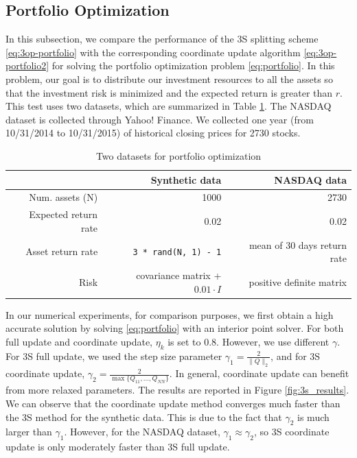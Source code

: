\subsection{Portfolio Optimization}
In this subsection, we compare the performance of the 3S splitting scheme \eqref{eq:3op-portfolio} with the corresponding coordinate update algorithm \eqref{eq:3op-portfolio2} for solving the portfolio optimization problem \eqref{eq:portfolio}. In this problem, our goal is to distribute our investment resources to all the assets so that the investment risk is minimized and the expected return is greater than $r$. This test uses two datasets, which are summarized in Table \ref{tab:3s-data}. The NASDAQ dataset is collected through Yahoo! Finance. We collected one year (from 10/31/2014 to 10/31/2015) of historical closing prices for 2730 stocks. 

\begin{table}[htbp]
\centering
 \begin{tabular}{rrr}
  \toprule
    & Synthetic data  & NASDAQ data\\
   \midrule
   Num. assets (N) & 1000 & 2730 \\
   Expected return rate & 0.02 & 0.02 \\
   Asset return rate & \texttt{3 * rand(N, 1) - 1} & mean of 30 days return rate \\
   Risk & covariance matrix + $0.01\cdot I$ & positive definite matrix \\
   \bottomrule
\end{tabular}
 \caption{Two datasets for portfolio optimization \label{tab:3s-data}}
\end{table}

In our numerical experiments, for comparison purposes, we first obtain a high accurate solution by solving \eqref{eq:portfolio} with an interior point solver. For both full update and coordinate update, $\eta_k$ is set to 0.8. However, we use different $\gamma$. For 3S full update, we used the step size parameter $\gamma_1 = \frac{2}{\|Q\|_2}$, and for 3S coordinate update, $\gamma_2 = \frac{2}{\max\{Q_{11}, ..., Q_{NN}\}}$. In general, coordinate update can benefit from more relaxed parameters. The results are reported in Figure \ref{fig:3s_results}. We can observe that the coordinate update method converges much faster than the 3S method for the synthetic data. This is due to the fact that $\gamma_2$ is much larger than $\gamma_1$. However, for the NASDAQ dataset, $\gamma_1 \approx \gamma_2$, so 3S coordinate update is only moderately faster than 3S full update.

